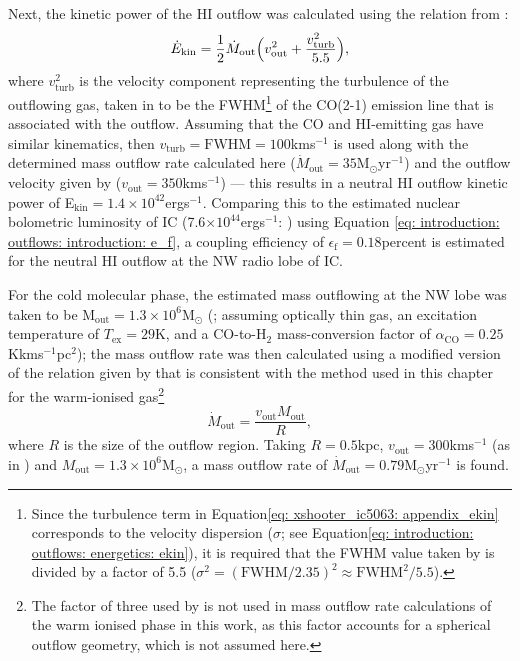 Next, the kinetic power of the HI outflow was calculated using the relation from \citet{Morganti2015}:
\begin{equation}
    \dot{E}_\mathrm{kin} = \frac{1}{2}\dot{M}_\mathrm{out}\Bigl(v^2_\mathrm{out}+\frac{v^2_\mathrm{turb}}{5.5}\Bigr),
\label{eq: xshooter_ic5063: appendix_ekin}
\end{equation}
where $v^2_\mathrm{turb}$ is the velocity component representing the turbulence of the outflowing gas, taken in \citet{Morganti2015} to be the FWHM\footnote{Since the turbulence term in Equation\;\ref{eq: xshooter_ic5063: appendix_ekin} corresponds to the velocity dispersion ($\sigma$; see Equation\;\ref{eq: introduction: outflows: energetics: ekin}), it is required that the FWHM value taken by \citet{Morganti2015} is divided by a factor of 5.5 ($\sigma^2=(\mathrm{FWHM}/2.35)^2\approx\mathrm{FWHM}^2/5.5$).} of the CO(2-1) emission line that is associated with the outflow. Assuming that the CO and HI-emitting gas have similar kinematics, then $v_\mathrm{turb}=\mathrm{FWHM}=100$\;km\;s$^{-1}$ \citep{Morganti2015} is used along with the determined mass outflow rate calculated here ($\dot{M}_\mathrm{out}=35$\;M$_\odot$\;yr$^{-1}$) and the outflow velocity given by \citet{Morganti2005} ($v_\mathrm{out}=350$\;km\;s$^{-1}$) --- this results in a neutral HI outflow kinetic power of \mbox{E$_\mathrm{kin}=1.4\times10^{42}$\;erg\;s$^{-1}$}. Comparing this to the estimated nuclear bolometric luminosity of IC (7.6$\times10^{44}$\;erg\;s$^{-1}$: \citealt{Nicastro2003, Morganti2007}) using Equation \ref{eq: introduction: outflows: introduction: e_f}, a coupling efficiency of $\epsilon_\mathrm{f}=0.18$\;per\;cent is estimated for the neutral HI outflow at the NW radio lobe of IC.

For the cold molecular phase, the estimated mass outflowing at the NW lobe was taken to be \mbox{M$_\mathrm{out}=1.3\times10^{6}$\;M$_\odot$} (\citealt{Oosterloo2017}; assuming optically thin gas, an excitation temperature of $T_\mathrm{ex}=29$\;K, and a CO-to-H$_\mathrm{2}$ mass-conversion factor of $\alpha_\mathrm{CO} =
0.25$\;K\;km\;s$^{-1}$\;pc$^2$); the mass outflow rate was then calculated using a modified version of the relation given by \citet{Oosterloo2017} that is consistent with the method used in this chapter for the warm-ionised gas\footnote{The factor of three used by \citet{Oosterloo2017} is not used in mass outflow rate calculations of the warm ionised phase in this work, as this factor accounts for a spherical outflow geometry, which is not assumed here.}
\begin{equation}
    \dot{M}_\mathrm{out}=\frac{v_\mathrm{out}M_\mathrm{out}}{R},
\end{equation}
where $R$ is the size of the outflow region. Taking $R=0.5$\;kpc, $v_\mathrm{out}=300$\;km\;s$^{-1}$ (as in \citealt{Oosterloo2017}) and \mbox{$M_\mathrm{out}=1.3\times10^{6}$\;M$_\odot$}, a mass outflow rate of \mbox{$\dot{M}_\mathrm{out}=0.79$\;M$_\odot$\;yr$^{-1}$} is found.

